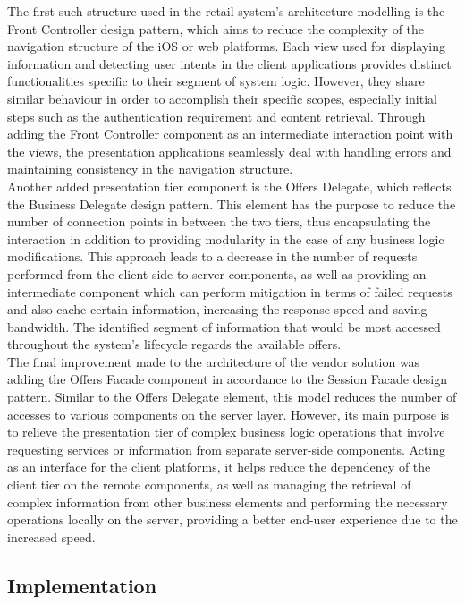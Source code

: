 The first such structure used in the retail system's architecture modelling is the Front Controller design pattern, which aims to reduce the complexity of the navigation structure of the iOS or web platforms. Each view used for displaying information and detecting user intents in the client applications provides distinct functionalities specific to their segment of system logic. However, they share similar behaviour in order to accomplish their specific scopes, especially initial steps such as the authentication requirement and content retrieval. Through adding the Front Controller component as an intermediate interaction point with the views, the presentation applications seamlessly deal with handling errors and maintaining consistency in the navigation structure.\\

Another added presentation tier component is the Offers Delegate, which reflects the Business Delegate design pattern. This element has the purpose to reduce the number of connection points in between the two tiers, thus encapsulating the interaction in addition to providing modularity in the case of any business logic modifications. This approach leads to a decrease in the number of requests performed from the client side to server components, as well as providing an intermediate component which can perform mitigation in terms of failed requests and also cache certain information, increasing the response speed and saving bandwidth. The identified segment of information that would be most accessed throughout the system's lifecycle regards the available offers.\\

The final improvement made to the architecture of the vendor solution was adding the Offers Facade component in accordance to the Session Facade design pattern. Similar to the Offers Delegate element, this model reduces the number of accesses to various components on the server layer. However, its main purpose is to relieve the presentation tier of complex business logic operations that involve requesting services or information from separate server-side components. Acting as an interface for the client platforms, it helps reduce the dependency of the client tier on the remote components, as well as 
managing the retrieval of complex information from other business elements and performing the necessary operations locally on the server, providing a better end-user experience due to the increased speed.

\subsection{Implementation}

